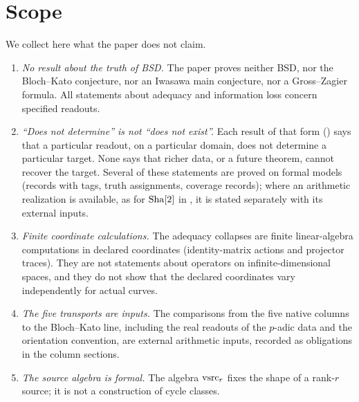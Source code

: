 \section{Scope}\label{sec:scope}

We collect here what the paper does not claim.

\begin{enumerate}
\item \emph{No result about the truth of BSD.}  The paper proves neither
  BSD, nor the Bloch--Kato conjecture, nor an Iwasawa main conjecture,
  nor a Gross--Zagier formula.  All statements about adequacy and
  information loss concern specified readouts.
\item \emph{``Does not determine'' is not ``does not exist''.}  Each
  result of that form () says that a particular
  readout, on a particular domain, does not determine a particular target.
  None says that richer data, or a future theorem, cannot recover the
  target.  Several of these statements are proved on formal models (records
  with tags, truth assignments, coverage records); where an arithmetic
  realization is available, as for $\operatorname{Sha}[2]$ in ,
  it is stated separately with its external inputs.
\item \emph{Finite coordinate calculations.}  The adequacy collapses are
  finite linear-algebra computations in declared coordinates
  (identity-matrix actions and projector traces).  They are not
  statements about operators on infinite-dimensional spaces, and they do
  not show that the declared coordinates vary independently for actual
  curves.
\item \emph{The five transports are inputs.}  The comparisons from the five
  native columns to the Bloch--Kato line, including the real readouts of
  the $p$-adic data and the orientation convention, are external
  arithmetic inputs, recorded as obligations in the column sections.
\item \emph{The source algebra is formal.}  The algebra $\mathrm{vsrc}_r$ fixes the
  shape of a rank-$r$ source; it is not a construction of cycle classes.
\end{enumerate}
